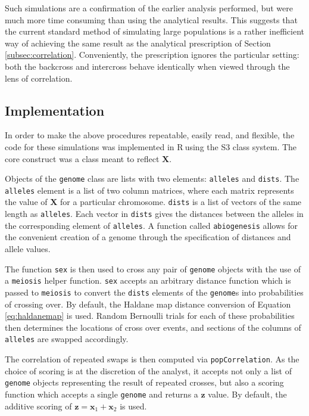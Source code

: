 \documentclass{article}
\newcommand{\code}[1]{\texttt{#1}}
\newcommand*{\R}{\textsf{R}$~$}
\newcommand{\ve}[1]{\mathbf{#1}}           %
\newcommand{\m}[1]{\mathbf{#1}}               %
\begin{document}
Such simulations are a confirmation of the earlier analysis performed, but were much more time consuming than using the analytical results. This suggests that the current standard method of simulating large populations is a rather inefficient way of achieving the same result as the analytical prescription of Section \ref{subsec:correlation}. Conveniently, the prescription ignores the particular setting: both the backcross and intercross behave identically when viewed through the lens of correlation.

\subsection{Implementation}

In order to make the above procedures repeatable, easily read, and flexible, the code for these simulations was implemented in \R using the S3 class system. The core construct was a class meant to reflect $\m{X}$.

Objects of the \code{genome} class are lists with two elements: \code{alleles} and \code{dists}. The \code{alleles} element is a list of two column matrices, where each matrix represents the value of $\m{X}$ for a particular chromosome. \code{dists} is a list of vectors of the same length as \code{alleles}. Each vector in \code{dists} gives the distances between the alleles in the corresponding element of \code{alleles}. A function called \code{abiogenesis} allows for the convenient creation of a genome through the specification of distances and allele values.

The function \code{sex} is then used to cross any pair of \code{genome} objects with the use of a \code{meiosis} helper function. \code{sex} accepts an arbitrary distance function which is passed to \code{meiosis} to convert the \code{dists} elements of the \code{genome}s into probabilities of crossing over. By default, the Haldane map distance conversion of Equation \ref{eq:haldanemap} is used. Random Bernoulli trials for each of these probabilities then determines the locations of cross over events, and sections of the columns of \code{alleles} are swapped accordingly.

The correlation of repeated swaps is then computed via \code{popCorrelation}. As the choice of scoring is at the discretion of the analyst, it accepts not only a list of \code{genome} objects representing the result of repeated crosses, but also a scoring function which accepts a single \code{genome} and returns a $\ve{z}$ value. By default, the additive scoring of $\ve{z} = \ve{x}_1 + \ve{x}_2$ is used.
\end{document}
